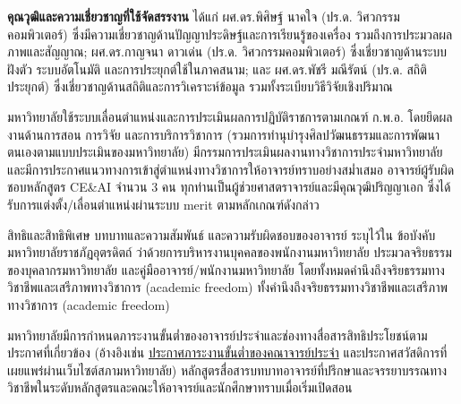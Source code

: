 \noindent\textbf{คุณวุฒิและความเชี่ยวชาญที่ใช้จัดสรรงาน}
ได้แก่ ผศ.ดร.พิศิษฐ์ นาคใจ (ปร.ด. วิศวกรรมคอมพิวเตอร์) ซึ่งมีความเชี่ยวชาญด้านปัญญาประดิษฐ์และการเรียนรู้ของเครื่อง รวมถึงการประมวลผลภาพและสัญญาณ; ผศ.ดร.กาญจนา ดาวเด่น (ปร.ด. วิศวกรรมคอมพิวเตอร์) ซึ่งเชี่ยวชาญด้านระบบฝังตัว ระบบอัตโนมัติ และการประยุกต์ใช้ในภาคสนาม; และ ผศ.ดร.พัชรี มณีรัตน์ (ปร.ด. สถิติประยุกต์) ซึ่งเชี่ยวชาญด้านสถิติและการวิเคราะห์ข้อมูล รวมทั้งระเบียบวิธีวิจัยเชิงปริมาณ


มหาวิทยาลัยใช้ระบบเลื่อนตำแหน่งและการประเมินผลการปฏิบัติราชการตามเกณฑ์ ก.พ.อ. โดยยึดผลงานด้านการสอน การวิจัย และการบริการวิชาการ (รวมการทำนุบำรุงศิลปวัฒนธรรมและการพัฒนาตนเองตามแบบประเมินของมหาวิทยาลัย) มีกรรมการประเมินผลงานทางวิชาการประจำมหาวิทยาลัย และมีการประกาศแนวทางการเข้าสู่ตำแหน่งทางวิชาการให้อาจารย์ทราบอย่างสม่ำเสมอ อาจารย์ผู้รับผิดชอบหลักสูตร CE\&AI จำนวน 3 คน ทุกท่านเป็นผู้ช่วยศาสตราจารย์และมีคุณวุฒิปริญญาเอก ซึ่งได้รับการแต่งตั้ง/เลื่อนตำแหน่งผ่านระบบ merit ตามหลักเกณฑ์ดังกล่าว


สิทธิและสิทธิพิเศษ บทบาทและความสัมพันธ์ และความรับผิดชอบของอาจารย์ ระบุไว้ใน
ข้อบังคับมหาวิทยาลัยราชภัฏอุตรดิตถ์ ว่าด้วยการบริหารงานบุคคลของพนักงานมหาวิทยาลัย ประมวลจริยธรรมของบุคลากรมหาวิทยาลัย และคู่มืออาจารย์/พนักงานมหาวิทยาลัย โดยทั้งหมดคำนึงถึงจริยธรรมทางวิชาชีพและเสรีภาพทางวิชาการ (academic freedom)
ทั้งคำนึงถึงจริยธรรมทางวิชาชีพและเสรีภาพทางวิชาการ (academic freedom)

มหาวิทยาลัยมีการกำหนดภาระงานขั้นต่ำของอาจารย์ประจำและช่องทางสื่อสารสิทธิประโยชน์ตามประกาศที่เกี่ยวข้อง (อ้างอิงเช่น \href{https://academic.uru.ac.th/document/06912.pdf}{ประกาศภาระงานขั้นต่ำของคณาจารย์ประจำ} และประกาศสวัสดิการที่เผยแพร่ผ่านเว็บไซต์สภามหาวิทยาลัย) หลักสูตรสื่อสารบทบาทอาจารย์ที่ปรึกษาและจรรยาบรรณทางวิชาชีพในระดับหลักสูตรและคณะให้อาจารย์และนักศึกษาทราบเมื่อเริ่มเปิดสอน


